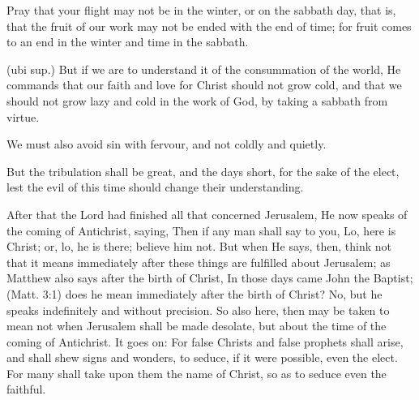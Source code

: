  Pray that your flight may not be in the winter, or on the sabbath day, that is, that the fruit of our work may not be ended with the end of time; for fruit comes to an end in the winter and time in the sabbath.

 (ubi sup.) But if we are to understand it of the consummation of the world, He commands that our faith and love for Christ should not grow cold, and that we should not grow lazy and cold in the work of God, by taking a sabbath from virtue.

 We must also avoid sin with fervour, and not coldly and quietly.

 But the tribulation shall be great, and the days short, for the sake of the elect, lest the evil of this time should change their understanding.

 

 After that the Lord had finished all that concerned Jerusalem, He now speaks of the coming of Antichrist, saying, Then if any man shall say to you, Lo, here is Christ; or, lo, he is there; believe him not. But when He says, then, think not that it means immediately after these things are fulfilled about Jerusalem; as Matthew also says after the birth of Christ, In those days came John the Baptist; (Matt. 3:1) does he mean immediately after the birth of Christ? No, but he speaks indefinitely and without precision. So also here, then may be taken to mean not when Jerusalem shall be made desolate, but about the time of the coming of Antichrist. It goes on: For false Christs and false prophets shall arise, and shall shew signs and wonders, to seduce, if it were possible, even the elect. For many shall take upon them the name of Christ, so as to seduce even the faithful.

